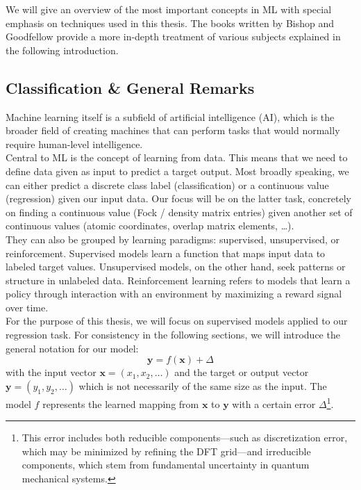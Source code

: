 We will give an overview of the most important concepts in ML with special emphasis on techniques used in this thesis. The books written by Bishop \parencite{ref:bishop2006pattern} and Goodfellow \parencite{ref:goodfellow2016deep} provide a more in-depth treatment of various subjects explained in the following introduction.
\subsection{Classification \& General Remarks}
\label{subsec:background_ml_general_concepts}
Machine learning itself is a subfield of artificial intelligence (AI), which is the broader field of creating machines that can perform tasks that would normally require human-level intelligence. \\
Central to ML is the concept of learning from data. This means that we need to define data given as input to predict a target output. Most broadly speaking, we can either predict a discrete class label (classification) or a continuous value (regression) given our input data. Our focus will be on the latter task, concretely on finding a continuous value (Fock / density matrix entries) given another set of continuous values (atomic coordinates, overlap matrix elements, \dots). \\
They can also be grouped by learning paradigms: supervised, unsupervised, or reinforcement. Supervised models learn a function that maps input data to labeled target values. Unsupervised models, on the other hand, seek patterns or structure in unlabeled data. Reinforcement learning refers to models that learn a policy through interaction with an environment by maximizing a reward signal over time.\\

For the purpose of this thesis, we will focus on supervised models applied to our regression task. For consistency in the following sections, we will introduce the general notation for our model: 
\begin{equation}
    \label{eq:general_ML_model_formula}
    \mathbf{y} = f(\mathbf{x}) + \Delta
\end{equation}
with the input vector $\mathbf{x} = (x_1, x_2, \dots)$ and the target or output vector $\mathbf{y} = (y_1, y_2, \dots)$ which is not necessarily of the same size as the input. The model $f$ represents the learned mapping from $\mathbf{x}$ to $\mathbf{y}$ with a certain 
error $\Delta$\footnote{This error includes both reducible components—such as discretization error, which may be minimized by refining the DFT grid—and irreducible components, which stem from fundamental uncertainty in quantum mechanical systems.}. 

